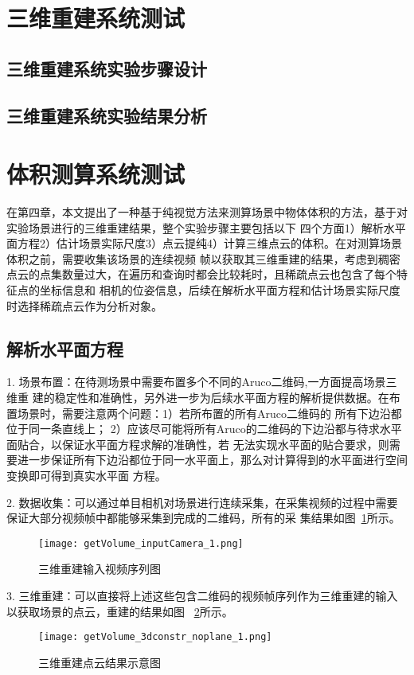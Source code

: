 \section{三维重建系统测试}
\label{sec:5.3}
\subsection{三维重建系统实验步骤设计}
\label{sec:5.3.1}
\subsection{三维重建系统实验结果分析}
\label{sec:5.3.2}
\section{体积测算系统测试}
\label{sec:5.4}
在第四章，本文提出了一种基于纯视觉方法来测算场景中物体体积的方法，基于对实验场景进行的三维重建结果，整个实验步骤主要包括以下
四个方面1）解析水平面方程2）估计场景实际尺度3）点云提纯4）计算三维点云的体积。在对测算场景体积之前，需要收集该场景的连续视频
帧以获取其三维重建的结果，考虑到稠密点云的点集数量过大，在遍历和查询时都会比较耗时，且稀疏点云也包含了每个特征点的坐标信息和
相机的位姿信息，后续在解析水平面方程和估计场景实际尺度时选择稀疏点云作为分析对象。
\subsection{解析水平面方程}
\label{sec:5.4.1}
1.	场景布置：在待测场景中需要布置多个不同的Aruco二维码,一方面提高场景三维重
建的稳定性和准确性，另外进一步为后续水平面方程的解析提供数据。在布置场景时，需要注意两个问题：1）若所布置的所有Aruco二维码的
所有下边沿都位于同一条直线上； 2）应该尽可能将所有Aruco的二维码的下边沿都与待求水平面贴合，以保证水平面方程求解的准确性，若
无法实现水平面的贴合要求，则需要进一步保证所有下边沿都位于同一水平面上，那么对计算得到的水平面进行空间变换即可得到真实水平面
方程。

2.	数据收集：可以通过单目相机对场景进行连续采集，在采集视频的过程中需要保证大部分视频帧中都能够采集到完成的二维码，所有的采
集结果如图~\ref{fig:getVolume_inputCamera}所示。

\begin{figure}[H] %
  \centering
  \texttt{[image: getVolume\_inputCamera\_1.png]}
  \caption{三维重建输入视频序列图}
  \label{fig:getVolume_inputCamera}
  \end{figure}

3.	三维重建：可以直接将上述这些包含二维码的视频帧序列作为三维重建的输入以获取场景的点云，重建的结果如图
~\ref{fig:getVolume_3dconstr_noplane}所示。
\begin{figure}[H] %
  \centering
  \texttt{[image: getVolume\_3dconstr\_noplane\_1.png]}
  \caption{三维重建点云结果示意图}
  \label{fig:getVolume_3dconstr_noplane}
  \end{figure}

